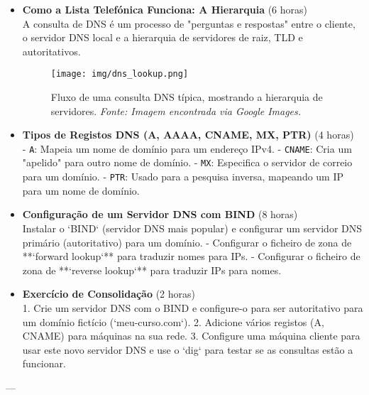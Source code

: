 \documentclass[10pt,a4paper]{article}
\begin{document}
	\begin{itemize}
		\item \textbf{Como a Lista Telefónica Funciona: A Hierarquia} (6 horas) \\
		A consulta de DNS é um processo de "perguntas e respostas" entre o cliente, o servidor DNS local e a hierarquia de servidores de raiz, TLD e autoritativos.
		
		\begin{figure}[h]
			\centering
			\texttt{[image: img/dns\_lookup.png]}
			\caption{Fluxo de uma consulta DNS típica, mostrando a hierarquia de servidores. \textit{Fonte: Imagem encontrada via Google Images.}}
			\label{fig:dns_lookup}
		\end{figure}
		
		\item \textbf{Tipos de Registos DNS (A, AAAA, CNAME, MX, PTR)} (4 horas) \\
		- \texttt{A}: Mapeia um nome de domínio para um endereço IPv4.
		- \texttt{CNAME}: Cria um "apelido" para outro nome de domínio.
		- \texttt{MX}: Especifica o servidor de correio para um domínio.
		- \texttt{PTR}: Usado para a pesquisa inversa, mapeando um IP para um nome de domínio.
		
		\item \textbf{Configuração de um Servidor DNS com BIND} (8 horas) \\
		Instalar o `BIND` (servidor DNS mais popular) e configurar um servidor DNS primário (autoritativo) para um domínio.
		- Configurar o ficheiro de zona de **`forward lookup`** para traduzir nomes para IPs.
		- Configurar o ficheiro de zona de **`reverse lookup`** para traduzir IPs para nomes.
		
		\item \textbf{Exercício de Consolidação} (2 horas) \\
		1. Crie um servidor DNS com o BIND e configure-o para ser autoritativo para um domínio fictício (`meu-curso.com`).
		2. Adicione vários registos (A, CNAME) para máquinas na sua rede.
		3. Configure uma máquina cliente para usar este novo servidor DNS e use o `dig` para testar se as consultas estão a funcionar.
	\end{itemize}
	
	---
	
\end{document}
